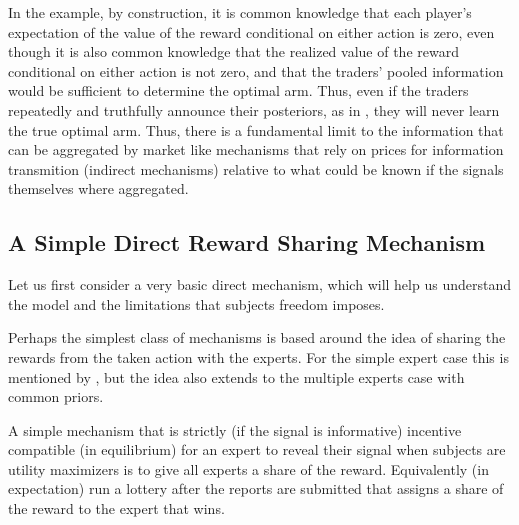 In the example, by construction, it is common knowledge that each player’s expectation of the value of the reward conditional on either action is zero, even though it is also common knowledge that the realized value of the reward conditional on either action is not zero, and that the traders’ pooled information would be sufficient to determine the optimal arm. Thus, even if the traders repeatedly and truthfully announce their posteriors, as in \cite{geanakoplos1982we}, they will never learn the true optimal arm. 
Thus, there is a fundamental limit to the information that can be aggregated by market like mechanisms that rely on prices for information transmition (indirect mechanisms) relative to what could be known if the signals themselves where aggregated. 


\subsection{A Simple Direct Reward Sharing Mechanism}


Let us first consider a very basic direct mechanism, which will help us understand the model and the limitations that subjects freedom imposes. 

Perhaps the simplest class of mechanisms is based around the idea of sharing the rewards from the taken action with the experts. For the simple expert case this is mentioned by \cite{othman2010decision}, but the idea also extends to the multiple experts case with common priors. 

A simple mechanism that is strictly (if the signal is informative) incentive compatible (in equilibrium) for an expert to reveal their signal when subjects are utility maximizers is to give all experts a share of the reward. Equivalently (in expectation) run a lottery after the reports are submitted that assigns a share of the reward to the expert that wins. 


